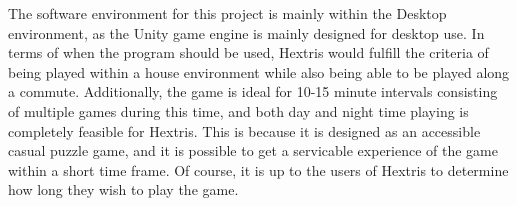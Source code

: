 \documentclass[12pt]{article}
\begin{document}
The software environment for this project is mainly within the Desktop environment, as the Unity game engine is mainly designed for desktop use.  In terms of when the program should be used, Hextris would fulfill the criteria of being played within a house environment while also being able to be played along a commute. Additionally, the game is ideal for 10-15 minute intervals consisting of multiple games during this time, and both day and night time playing is completely feasible for Hextris. This is because it is designed as an accessible casual puzzle game, and it is possible to get a servicable experience of the game within a short time frame. Of course, it is up to the users of Hextris to determine how long they wish to play the game.
\end{document}
